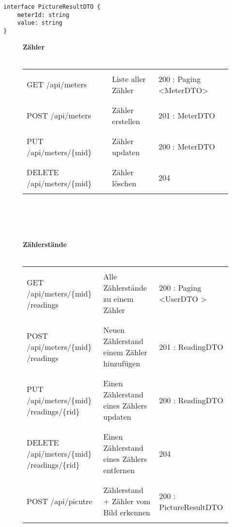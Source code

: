 \begin{lstlisting}
interface PictureResultDTO {
	meterId: string
	value: string
}
\end{lstlisting}

\begin{figure}[H]
	\textbf {Zähler} \\ \\
	\begin{tabularx}{\textwidth}{X | X | X}
		\hline \\
		GET 	/api/meters & Liste aller Zähler & 200 : Paging \textless MeterDTO\textgreater \\ \\ \hline
		\\ POST /api/meters & Zähler erstellen & 201 : MeterDTO\\ \\ \hline
		\\  PUT /api/meters/\{mid\} & Zähler updaten & 200 : MeterDTO \\ \\ \hline
		\\ DELETE	/api/meters/\{mid\} & Zähler löschen & 204 \\ \\ \hline
	\end{tabularx}
\\ \\ \\ \\

	\textbf{Zählerstände} \\ \\
	\begin{tabularx}{\textwidth}{X | X | X}
		\hline \\
		GET	/api/meters/\{mid\} /readings & Alle Zählerstände zu einem Zähler & 200 : Paging \textless UserDTO \textgreater \\ \\ \hline
	\\ 	POST /api/meters/\{mid\} /readings & Neuen Zählerstand einem Zähler hinzufügen & 201 : ReadingDTO\\ \\ \hline
	\\	PUT /api/meters/\{mid\} /readings/\{rid\} & Einen Zählerstand eines Zählers updaten & 200 : ReadingDTO \\ \\ \hline
	\\	DELETE /api/meters/\{mid\} /readings/\{rid\} & Einen Zählerstand eines Zählers entfernen & 204 \\ \\   \hline
	\\	POST /api/picutre & Zählerstand + Zähler vom Bild erkennen & 200 : PictureResultDTO \\ \\ \hline
	\end{tabularx}

\end{figure}

